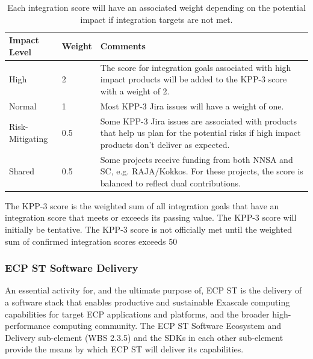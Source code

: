 \begin{table}[h!]
	\begin{tabular}{|L{1.0in}|L{0.5in}|L{4.5in}|}\hline
		Impact Level & Weight & Comments\\\hline
		High & 2 & The score for integration goals associated with high impact products will be added to the KPP-3 score with a weight of 2.\\\hline
		Normal & 1 & Most KPP-3 Jira issues will have a weight of one.\\\hline
		Risk-Mitigating & 0.5 & Some KPP-3 Jira issues are associated with products that help us plan for the potential risks if high impact products don’t deliver as expected.\\\hline
		Shared  & 0.5 & Some projects receive funding from both NNSA and SC, e.g. RAJA/Kokkos. For these projects, the score is balanced to reflect dual contributions.\\\hline
	\end{tabular}
	\caption{\label{table:KPP-3-impact} Each integration score will have an associated weight depending on the potential impact if integration targets are not met.}
\end{table}

The KPP-3 score is the weighted sum of all integration goals that have an integration score that meets or exceeds its passing value. 
The KPP-3 score will initially be tentative.  The KPP-3 score is not officially met until the weighted sum of confirmed integration scores exceeds 50%


\subsubsection{ECP ST Software Delivery}
An essential activity for, and the ultimate purpose of, ECP ST is the delivery of a software stack that enables productive and sustainable Exascale computing capabilities for target ECP applications and platforms, and the broader high-performance computing community. The ECP ST Software Ecosystem and Delivery sub-element (WBS 2.3.5) and the SDKs in each other sub-element provide the means by which ECP ST will deliver its capabilities.
